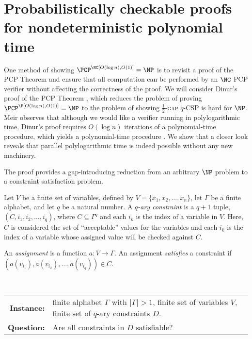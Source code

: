 \section{Probabilistically checkable proofs for nondeterministic polynomial time}
\label{sec:dinur}

One method of showing $\PCP^\NC[O(\log n), O(1)] = \NP$ is to revisit a proof of the PCP Theorem and ensure that all computation can be performed by an $\NC$ PCP verifier without affecting the correctness of the proof.
We will consider Dinur's proof of the PCP Theorem \autocite{dinur07}, which reduces the problem of proving $\PCP^\P[O(\log n), O(1)] = \NP$ to the problem of showing \textsc{$\frac{1}{2}$-gap $q$-CSP} is hard for $\NP$.
Meir observes that although we would like a verifier running in polylogarithmic time, Dinur's proof requires $O(\log n)$ iterations of a polynomial-time procedure, which yields a polynomial-time procedure \autocite[Section~1.2.1]{meir09}.
We show that a closer look reveals that parallel polylogarithmic time is indeed possible without any new machinery.

The proof provides a gap-introducing reduction from an arbitrary $\NP$ problem to a constraint satisfaction problem.

\begin{definition}
  Let $V$ be a finite set of variables, defined by $V = \{x_1, x_2, \dotsc, x_n\}$, let $\Gamma$ be a finite alphabet, and let $q$ be a natural number.
  A \emph{$q$-ary constraint} is a $q + 1$ tuple, $(C, i_1, i_2, \dotsc, i_q)$, where $C \subseteq \Gamma^q$ and each $i_k$ is the index of a variable in $V$.
  Here, $C$ is considered the set of ``acceptable'' values for the variables and each $i_k$ is the index of a variable whose assigned value will be checked against $C$.

  An \emph{assignment} is a function $a \colon V \to \Gamma$.
  An assignment \emph{satisfies} a constraint if $(a(v_{i_1}), a(v_{i_2}), \dotsc, a(v_{i_q})) \in C$.
\end{definition}

\begin{definition}
  \mbox{} \\
  \begin{tabular}{r p{9.5cm}}
    \textbf{Instance:} & finite alphabet $\Gamma$ with $|\Gamma| > 1$, finite set of variables $V$, finite set of $q$-ary constraints $D$. \\
    \textbf{Question:} & Are all constraints in $D$ satisfiable?
  \end{tabular}
\end{definition}


